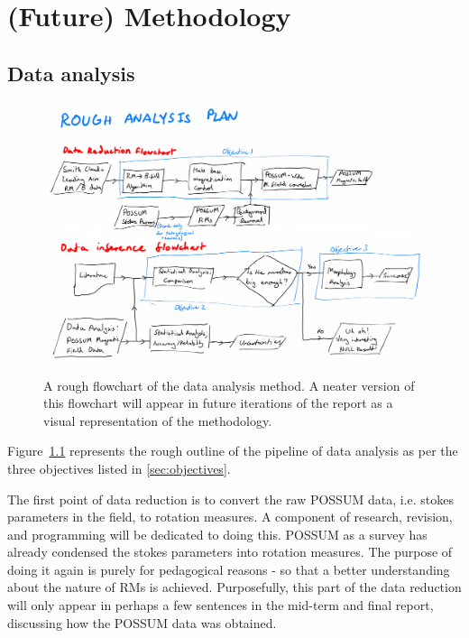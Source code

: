 \chapter{(Future) Methodology}
\label{cha:methodology}

\section{Data analysis}
\label{sec:method}

\begin{figure}[h]
  \label{fig:flowchart}
  \includegraphics[width=\columnwidth]{figs/flowchart.png}
  \caption{A rough flowchart of the data analysis method. A neater version of this flowchart will appear in future iterations of the report as a visual representation of the methodology.}
\end{figure}

Figure~\ref{fig:flowchart} represents the rough outline of the pipeline of data analysis as per the three objectives listed in \ref{sec:objectives}.

The first point of data reduction is to convert the raw POSSUM data, i.e. stokes parameters in the field, to rotation measures. A component of research, revision, and programming will be dedicated to doing this. POSSUM as a survey has already condensed the stokes parameters into rotation measures. The purpose of doing it again is purely for pedagogical reasons - so that a better understanding about the nature of RMs is achieved. Purposefully, this part of the data reduction will only appear in perhaps a few sentences in the mid-term and final report, discussing how the POSSUM data was obtained.


